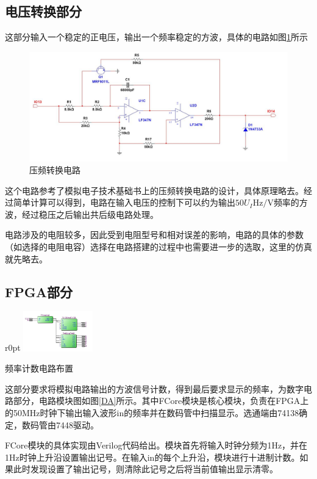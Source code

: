 \documentclass[UTF8,a4paper,landscape,16pt]{paper}
\begin{document}
\begin{multicols}{4}
\subsection{电压转换部分}
这部分输入一个稳定的正电压，输出一个频率稳定的方波，具体的电路如图\ref{VF}所示
\begin{figure}[H]
\centering
\includegraphics[width=\columnwidth]{VF.jpg}
\caption{压频转换电路}
\label{VF}
\end{figure}

\noindent 这个电路参考了模拟电子技术基础书上的压频转换电路的设计，具体原理略去。经过简单计算可以得到，电路在输入电压的控制下可以约为输出$50U_I\mathrm{Hz/V}$频率的方波，经过稳压之后输出共后级电路处理。

\noindent 电路涉及的电阻较多，因此受到电阻型号和相对误差的影响，电路的具体的参数（如选择的电阻电容）选择在电路搭建的过程中也需要进一步的选取，这里的仿真就先略去。
\subsection{FPGA部分}
\begin {wrapfigure}{r}{0pt}
\includegraphics [width=30mm]{Block.jpg}
\caption{频率计数电路布置}
\label{DA}
\end {wrapfigure}
这部分要求将模拟电路输出的方波信号计数，得到最后要求显示的频率，为数字电路部分，电路模块图如图\ref{DA}所示。其中FCore模块是核心模块，负责在FPGA上的50MHz时钟下输出输入波形in的频率并在数码管中扫描显示。选通端由74138确定，数码管由7448驱动。

\noindent FCore模块的具体实现由Verilog代码给出。模块首先将输入时钟分频为1Hz，并在1Hz时钟上升沿设置输出记号。在输入in的每个上升沿，模块进行十进制计数。如果此时发现设置了输出记号，则清除此记号之后将当前值输出显示清零。


\end{multicols}
\end{document}
